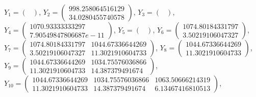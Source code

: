 \begin{sloppypar}

${Y_1=\begin{pmatrix}

\end{pmatrix}
}$, 
${Y_2=\begin{pmatrix}
998.258064516129\\
34.0280455740578
\end{pmatrix}
}$, 
${Y_3=\begin{pmatrix}

\end{pmatrix}
}$, 
${Y_4=\begin{pmatrix}
1070.93333333297\\
7.90549847806687e-11
\end{pmatrix}
}$, 
${Y_5=\begin{pmatrix}

\end{pmatrix}
}$, 
${Y_6=\begin{pmatrix}
1074.80184331797\\
3.50219106047327
\end{pmatrix}
}$, 
${Y_7=\begin{pmatrix}
1074.80184331797&1044.67336644269\\
3.50219106047327&11.3021910604733
\end{pmatrix}
}$, 
${Y_8=\begin{pmatrix}
1044.67336644269\\
11.3021910604733
\end{pmatrix}
}$, 
${Y_9=\begin{pmatrix}
1044.67336644269&1034.75576036866\\
11.3021910604733&14.387379491674
\end{pmatrix}
}$, 
${Y_10=\begin{pmatrix}
1044.67336644269&1034.75576036866&1063.50666214319\\
11.3021910604733&14.387379491674&6.13467416810513
\end{pmatrix}
}$, 
\end{sloppypar}



